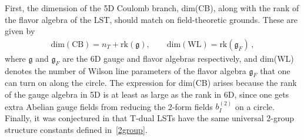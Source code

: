 \documentclass[11pt]{article}
\numberwithin{equation}{section}
\newcommand{\fg}{\mathfrak{g}}
\newcommand{\Dim}{\text{dim}}
\newcommand{\rk}{\text{rk}}
\begin{document}
First, the dimension of the 5D Coulomb branch, dim(CB), along with the rank of the flavor algebra of the LST, should match on field-theoretic grounds. These are given by
\begin{align}
\label{eq:coulFlav}
\Dim(\text{CB})=n_{T} + \text{rk}(\fg), \qquad \Dim(\text{WL})=\rk(\fg_{F})\,,
\end{align}
where $\fg$ and $\fg_{F}$ are the 6D gauge and flavor algebras respectively, and dim(WL) denotes the number of Wilson line parameters of the flavor algebra $\fg_F$ that one can turn on along the circle. The expression for dim(CB) arises because the rank of the gauge algebra in 5D is at least as large as the rank in 6D, since one gets extra Abelian gauge fields from reducing the 2-form fields $b_{I}^{(2)}$ on a circle. Finally, it was conjectured in \cite{DelZotto:2020sop} that T-dual LSTs have the same universal 2-group structure constants defined in~\eqref{2group}. 
\end{document}
